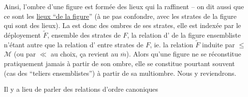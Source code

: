 Ainsi, l'ombre d'une figure est formée des lieux qui la raffinent -- on dit aussi que ce sont les \uline{lieux ``de la figure}'' (à ne pas confondre, avec les strates de la figure qui sont des lieux). La  est donc  des ombres de ses strates, elle est indexée par le déployement $\widetilde F$, ensemble des strates de $F$, la relation d' de la figure ensembliste n'étant autre que la relation d' entre strates de $F$, ie. la relation  $\widetilde F$ induite par $\leq$  $\mathcal{M}$ (ou par $\ll$ au choix, ça revient au $\overline m$). Alors qu'une figure ne se réconstitue pratiquement jamais à partir de son ombre, elle se constitue pourtant souvent (cas des ``teliers ensemblistes'') à partir de sa multiombre. Nous y reviendrons.

 Il y a lieu de parler des relations d'ordre canoniques
